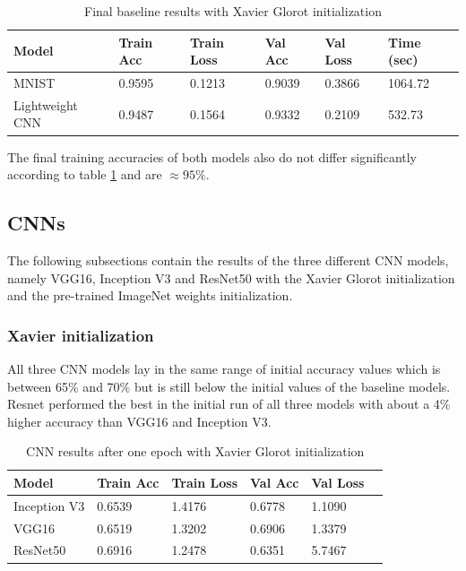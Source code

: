 \documentclass{article}
\theoremstyle{definition}
\theoremstyle{remark}
\begin{document}
\begin{table}[h!]
\center
\begin{tabular}{|l|l|l|l|l|l|}
\hline
\textbf{Model} & \textbf{Train Acc} & \textbf{Train Loss} & \textbf{Val Acc} & \textbf{Val Loss} & \textbf{Time (sec)}\\ \hline
MNIST		    & 0.9595 		 & 0.1213      & 0.9039		  & 0.3866	 &	1064.72\\ \hline
Lightweight CNN    & 0.9487   	 & 0.1564 	   & 0.9332		  &	0.2109	 &  532.73 \\ \hline
\end{tabular}
\caption{Final baseline results with Xavier Glorot initialization}
\label{tab:final_baseline_results_xavier}
\end{table}

The final training accuracies of both models also do not differ significantly according to table \ref{tab:final_baseline_results_xavier} and are $\approx 95\%$.

\newpage

\subsection{CNNs}

The following subsections contain the results of the three different CNN models, namely VGG16, Inception V3 and ResNet50 with the Xavier Glorot initialization and the pre-trained ImageNet weights initialization.


\subsubsection{Xavier initialization}

All three CNN models lay in the same range of initial accuracy values which is between 65\% and 70\% but is still below the initial values of the baseline models. Resnet performed the best in the initial run of all three models with about a 4\% higher accuracy than VGG16 and Inception V3.



\begin{table}[h!]
\center
\begin{tabular}{|l|l|l|l|l|l|}
\hline
\textbf{Model} & \textbf{Train Acc} & \textbf{Train Loss} & \textbf{Val Acc} & \textbf{Val Loss}\\ \hline
Inception V3 & 0.6539 	& 1.4176 	 &  0.6778	 & 1.1090\\ \hline
VGG16  		& 0.6519   	& 1.3202     &  0.6906	 &	1.3379\\ \hline
ResNet50  	& 0.6916  	& 1.2478 	 &  0.6351	 &	5.7467\\ \hline
\end{tabular}
\caption{CNN results after one epoch with Xavier Glorot initialization}
\label{tab:one_epoch_cnn_results_xavier}
\end{table}
\end{document}
